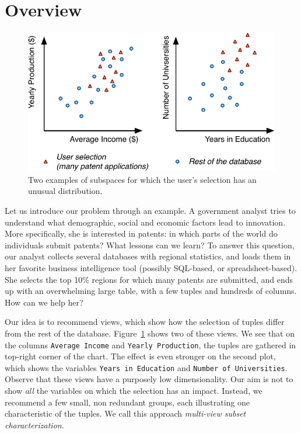 \section{Overview}
\label{sec:genoverview}
\begin{figure}
  \centering
  \includegraphics[width=\columnwidth]{Figures/Example}
  \caption{Two examples of subspaces for which the user's selection has an
  unusual distribution.}
  \label{pic:example}
\end{figure}
Let us introduce our problem through an example. A government analyst tries to
understand what demographic, social and economic factors lead to innovation.
More specifically, she is interested in patents: in which parts of the world do
individuals submit patents? What lessons can we learn? To answer this question,
our analyst collects several databases with regional statistics, and loads them
in her favorite business intelligence tool (possibly SQL-based, or
spreadsheet-based). She selects the top 10\% regions for which many patents are
submitted, and ends up with an overwhelming large table, with a few tuples and
hundreds of columns. How can we help her?
 
Our idea is to recommend views, which show how the selection of tuples differ
from the rest of the database. Figure~\ref{pic:example} shows two of these
views. We see that on the columns \texttt{Average Income} and \texttt{Yearly
Production}, the tuples are gathered in top-right corner of the chart. The
effect is even stronger on the second plot, which shows the variables
\texttt{Years in Education} and \texttt{Number of Universities}. Observe that
these views have a purposely low dimensionality. Our aim is not to show
\emph{all} the variables on which the selection has an impact. Instead, we
recommend a few small, non redundant groups, each illustrating one
characteristic of the tuples. We call this approach \emph{multi-view subset
characterization}.

